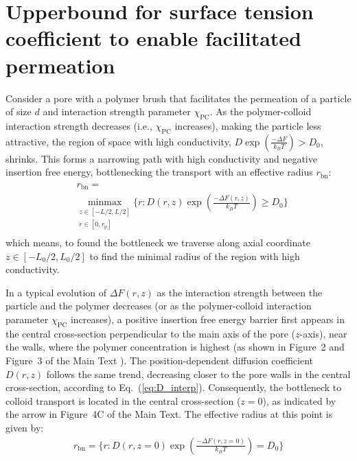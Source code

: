 \documentclass[10pt, a4paper]{article}
\begin{document}
\section{Upperbound for surface tension coefficient to enable facilitated permeation}
\begin{multicols}{2}
Consider a pore with a polymer brush that facilitates the permeation of a particle of size $d$ and interaction strength parameter $\chi_{\text{PC}}$.
As the polymer-colloid interaction strength decreases (i.e., $\chi_{\text{PC}}$ increases), making the particle less attractive, the region of space with high conductivity, $D\exp\left(\frac{-\Delta F}{k_B T}\right) > D_0$, shrinks.
This forms a narrowing path with high conductivity and negative insertion free energy, bottlenecking the transport with an effective radius $r_{\text{bn}}$:
\begin{eqnarray}
    \begin{aligned}
        &r_{\text{bn}} =\\
        &\underset{\substack{z \in [-L/2, L/2]\\r \in [0, r_{\text{p}}]}}{\text{minmax}} \{r : D(r, z)\exp\left(\frac{-\Delta F(r,z)}{k_B T}\right) \ge D_{0}\}
    \end{aligned}
\end{eqnarray}
which means, to found the bottleneck we traverse along axial coordinate $z \in [-L_{0}/2, L_{0}/2]$ to find the minimal radius of the region with high conductivity.

In a typical evolution of $\Delta F(r,z)$ as the interaction strength between the particle and the polymer decreases (or as the polymer-colloid interaction parameter $\chi_{\text{PC}}$ increases), a positive insertion free energy barrier first appears in the central cross-section perpendicular to the main axis of the pore ($z$-axis), near the walls, where the polymer concentration is highest (as shown in 
Figure~2 and Figure~3 of the Main Text%
).
The position-dependent diffusion coefficient $D(r,z)$ follows the same trend, decreasing closer to the pore walls in the central cross-section, according to Eq.~(\ref{eq:D_interp}).
Consequently, the bottleneck to colloid transport is located in the central cross-section ($z = 0$), as indicated by the arrow in %
Figure~4C of the Main Text. 
The effective radius at this point is given by:
\begin{eqnarray}
    r_{\text{bn}} = \{r : D(r, z=0)\exp\left(\frac{-\Delta F(r,z=0)}{k_B T}\right) = D_{0}\}
\end{eqnarray}


\end{multicols}
\end{document}
